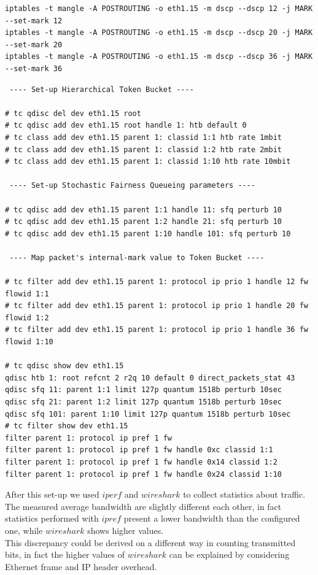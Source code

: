 \documentclass{llncs}
\begin{document}
\lstset{language=sh, caption=From DSCP to internal-marking (netlab15), basicstyle=\ttfamily\scriptsize , breaklines=true}
\begin{lstlisting}
iptables -t mangle -A POSTROUTING -o eth1.15 -m dscp --dscp 12 -j MARK --set-mark 12
iptables -t mangle -A POSTROUTING -o eth1.15 -m dscp --dscp 20 -j MARK --set-mark 20
iptables -t mangle -A POSTROUTING -o eth1.15 -m dscp --dscp 36 -j MARK --set-mark 36
\end{lstlisting}

\lstset{language=sh, caption=Configuration of the traffic shaper (netlab15), basicstyle=\ttfamily\scriptsize , breaklines=true}
\begin{lstlisting}
 ---- Set-up Hierarchical Token Bucket ---- 
 
# tc qdisc del dev eth1.15 root
# tc qdisc add dev eth1.15 root handle 1: htb default 0
# tc class add dev eth1.15 parent 1: classid 1:1 htb rate 1mbit
# tc class add dev eth1.15 parent 1: classid 1:2 htb rate 2mbit
# tc class add dev eth1.15 parent 1: classid 1:10 htb rate 10mbit

 ---- Set-up Stochastic Fairness Queueing parameters ---- 
 
# tc qdisc add dev eth1.15 parent 1:1 handle 11: sfq perturb 10
# tc qdisc add dev eth1.15 parent 1:2 handle 21: sfq perturb 10
# tc qdisc add dev eth1.15 parent 1:10 handle 101: sfq perturb 10

 ---- Map packet's internal-mark value to Token Bucket ---- 
 
# tc filter add dev eth1.15 parent 1: protocol ip prio 1 handle 12 fw flowid 1:1
# tc filter add dev eth1.15 parent 1: protocol ip prio 1 handle 20 fw flowid 1:2
# tc filter add dev eth1.15 parent 1: protocol ip prio 1 handle 36 fw flowid 1:10

# tc qdisc show dev eth1.15
qdisc htb 1: root refcnt 2 r2q 10 default 0 direct_packets_stat 43
qdisc sfq 11: parent 1:1 limit 127p quantum 1518b perturb 10sec 
qdisc sfq 21: parent 1:2 limit 127p quantum 1518b perturb 10sec 
qdisc sfq 101: parent 1:10 limit 127p quantum 1518b perturb 10sec 
# tc filter show dev eth1.15
filter parent 1: protocol ip pref 1 fw 
filter parent 1: protocol ip pref 1 fw handle 0xc classid 1:1 
filter parent 1: protocol ip pref 1 fw handle 0x14 classid 1:2 
filter parent 1: protocol ip pref 1 fw handle 0x24 classid 1:10 
\end{lstlisting}

After this set-up we used $iperf$ and $wireshark$ to collect statistics about traffic. The measured average bandwidth are slightly different each other, in fact statistics performed with $ipref$ present a lower bandwidth than the configured one, while $wireshark$ shows higher values.\\
This discrepancy could be derived on a different way in counting transmitted bits, in fact the higher values of $wireshark$ can be explained by considering Ethernet frame and IP header overhead.\\
 
\end{document}
